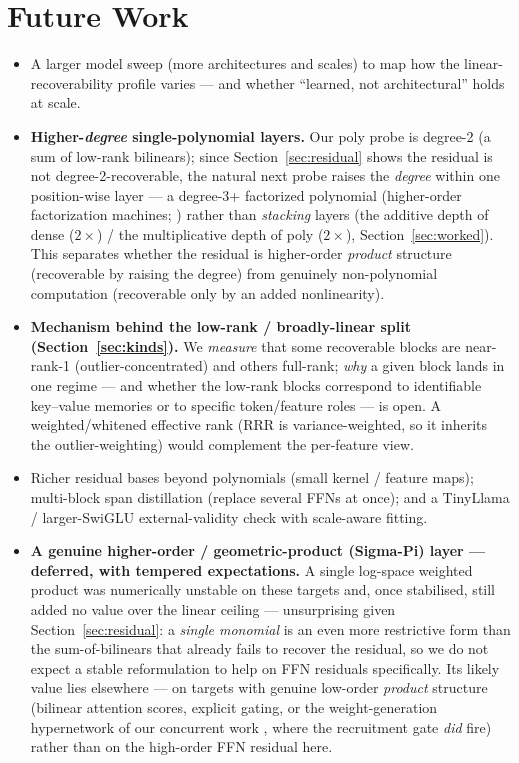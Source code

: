 \documentclass{article}
\begin{document}
\section{Future Work}
\label{sec:future}

\begin{itemize}
\item A larger model sweep (more architectures and scales) to map how the linear-recoverability
  profile varies --- and whether ``learned, not architectural'' holds at scale.
\item \textbf{Higher-\emph{degree} single-polynomial layers.} Our poly probe is degree-2 (a sum of
  low-rank bilinears); since Section~\ref{sec:residual} shows the residual is not degree-2-recoverable,
  the natural next probe raises the \emph{degree} within one position-wise layer --- a degree-3+
  factorized polynomial (higher-order factorization machines; \citealp{blondel2016hofm}) rather than
  \emph{stacking} layers (the additive depth of dense ($2\times$) / the multiplicative depth of poly
  ($2\times$), Section~\ref{sec:worked}). This separates whether the residual is higher-order
  \emph{product} structure (recoverable by raising the degree) from genuinely non-polynomial
  computation (recoverable only by an added nonlinearity).
\item \textbf{Mechanism behind the low-rank / broadly-linear split (Section~\ref{sec:kinds}).} We
  \emph{measure} that some recoverable blocks are near-rank-1 (outlier-concentrated) and others
  full-rank; \emph{why} a given block lands in one regime --- and whether the low-rank blocks
  correspond to identifiable key--value memories \citep{geva2021kv} or to specific token/feature
  roles --- is open. A weighted/whitened effective rank (RRR is variance-weighted, so it inherits the
  outlier-weighting) would complement the per-feature view.
\item Richer residual bases beyond polynomials (small kernel / feature maps); multi-block span
  distillation (replace several FFNs at once); and a TinyLlama / larger-SwiGLU external-validity check
  with scale-aware fitting.
\item \textbf{A genuine higher-order / geometric-product (Sigma-Pi) layer --- deferred, with tempered
  expectations.} A single log-space weighted product was numerically unstable on these targets and,
  once stabilised, still added no value over the linear ceiling --- unsurprising given
  Section~\ref{sec:residual}: a \emph{single monomial} is an even more restrictive form than the
  sum-of-bilinears that already fails to recover the residual, so we do not expect a stable
  reformulation to help on FFN residuals specifically. Its likely value lies elsewhere --- on targets
  with genuine low-order \emph{product} structure (bilinear attention scores, explicit gating, or the
  weight-generation hypernetwork of our concurrent work \citep{whipp2026pi}, where the recruitment
  gate \emph{did} fire) rather than on the high-order FFN residual here.
\end{itemize}
\end{document}
